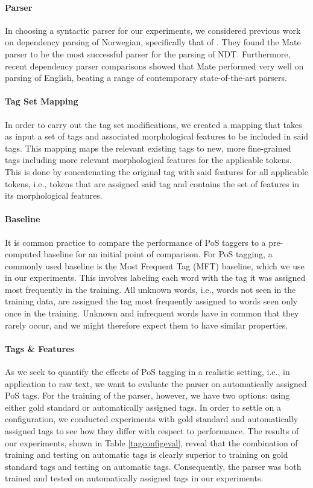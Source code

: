 \documentclass[11pt,a4paper]{article}
\begin{document}
\paragraph{Parser}
In choosing a syntactic parser for our experiments, we considered previous work
on dependency parsing of Norwegian, specifically that of \cite{Sol:Skj:Ovr:14}.
They found the Mate parser \cite{Boh:10} to be the most successful parser for
the parsing of NDT. Furthermore, recent dependency parser comparisons
\cite{Cho:Tet:Ste:15} showed that Mate performed very well on parsing of
English, beating a range of contemporary state-of-the-art parsers.

\paragraph{Tag Set Mapping}
In order to carry out the tag set modifications, we created a mapping that
takes as input a set of tags and associated morphological features to be
included in said tags. This mapping maps the relevant existing tags to new,
more fine-grained tags including more relevant morphological features for the
applicable tokens. This is done by concatenating the original tag with said
features for all applicable tokens, i.e., tokens that are assigned said tag and
contains the set of features in its morphological features.

\paragraph{Baseline}
It is common practice to compare the performance of PoS taggers to a
pre-computed baseline for an initial point of comparison.
For PoS tagging, a commonly used baseline is the Most Frequent Tag (MFT)
baseline, which we use in our experiments. This involves labeling each word
with the tag it was assigned most frequently in the training. All unknown
words, i.e., words not seen in the training data, are assigned the tag most
frequently assigned to words seen only once in the training. Unknown and
infrequent words have in common that they rarely occur, and we might therefore
expect them to have similar properties.

\paragraph{Tags \& Features}
As we seek to quantify the effects of PoS tagging in a realistic setting, i.e.,
in application to raw text, we want to evaluate the parser on automatically
assigned PoS tags. For the training of the parser, however, we have two
options: using either gold standard or automatically assigned tags. In order to
settle on a configuration, we conducted experiments with gold standard and
automatically assigned tags to see how they differ with respect to performance.
The results of our experiments, shown in Table \ref{tagconfigeval}, reveal that
the combination of training and testing on automatic tags is clearly superior
to training on gold standard tags and testing on automatic tags. Consequently,
the parser was both trained and tested on automatically assigned tags in our
experiments.
\end{document}
